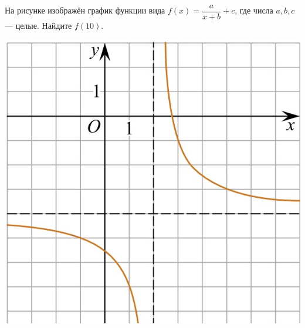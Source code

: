 \begin{class}[number=4]
\begin{listofex}
\begin{minipage}[c]{0.25\textwidth}
		\end{minipage}
		\item
		\begin{minipage}[t]{0.67\textwidth}
			На рисунке изображён график функции вида \(f(x)=\dfrac{a}{x+b}+c\), где числа \(a, b, c\) --- целые. Найдите \(f(10)\).
		\end{minipage}
		\begin{minipage}[c]{0.25\textwidth}
			\includegraphics[align=t, width=\textwidth]{pics/G101M4C4-9.jpg}
		\end{minipage}
	\end{listofex}
\end{class}
%
%
